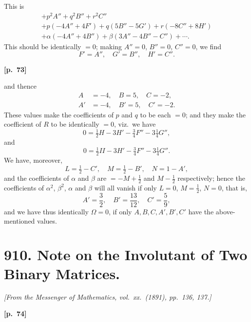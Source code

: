 \documentclass[11pt,a4paper]{book}
\begin{document}
This is
\begin{multline*}
+ p^2 A'' + q^2 B'' + r^2 C'' \\
+ p(-4A'' + 4F') + q(5B'' - 5G') + r(-8C'' + 8H') \\
+ \alpha(-4A'' + 4B'') + \beta(3A'' - 4B'' - C'') + \cdots.
\end{multline*}
This should be identically $= 0$; making $A'' = 0$, $B'' = 0$, $C'' = 0$, we find
$$
F' = A'', \quad G' = B'', \quad H' = C''.
$$

\vspace{0.5em}
\noindent\textbf{[p.\ 73]}

and thence
\begin{align*}
A &= -4, \quad B = 5, \quad C = -2, \\
A' &= -4, \quad B' = 5, \quad C' = -2.
\end{align*}
These values make the coefficients of $p$ and $q$ to be each $= 0$; and they make the coefficient of $R$ to be identically $= 0$, viz.\ we have
$$
0 = \tfrac{1}{2}H - 3H' - \tfrac{3}{4}F'' - 3\tfrac{1}{4}G'',
$$
and
$$
0 = \tfrac{1}{2}II - 3H' - \tfrac{3}{4}F'' - 3\tfrac{1}{4}G''.
$$
We have, moreover,
$$
L = \tfrac{1}{2} - C', \quad M = \tfrac{1}{2} - B', \quad N = 1 - A',
$$
and the coefficients of $\alpha$ and $\beta$ are $= -M + \frac{1}{2}$ and $M - \frac{1}{2}$ respectively; hence the coefficients of $\alpha^2$, $\beta^2$, $\alpha$ and $\beta$ will all vanish if only $L = 0$, $M = \frac{1}{2}$, $N = 0$, that is,
$$
A' = \frac{3}{2}, \quad B' = \frac{13}{12}, \quad C' = \frac{5}{9},
$$
and we have thus identically $\Omega = 0$, if only $A, B, C, A', B', C'$ have the above-mentioned values.

\newpage

\section*{910. Note on the Involutant of Two Binary Matrices.}

\noindent\textit{[From the Messenger of Mathematics, vol.\ xx.\ (1891), pp.\ 136, 137.]}

\vspace{0.5em}
\noindent\textbf{[p.\ 74]}
\end{document}
